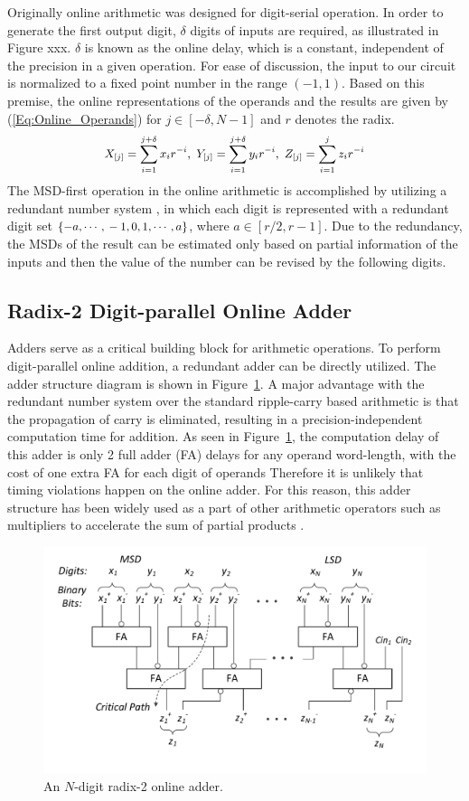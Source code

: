 \documentclass{acm_proc_article-sp}
\begin{document}
Originally online arithmetic was designed for digit-serial operation. In order to generate the first output digit, $\delta$ digits of inputs are required, as illustrated in Figure xxx. $\delta$ is known as the online delay, which is a constant, independent of the precision in a given operation. For ease of discussion, the input to our circuit is normalized to a fixed point number in the range $(-1,1)$. Based on this premise, the online representations of the operands and the results are given by (\ref{Eq:Online_Operands}) \cite{Ercegovac_Book} for $j\in[-\delta,N-1]$ and $r$ denotes the radix.
%
\begin{eqnarray}\label{Eq:Online_Operands}
\footnotesize
  X_{[j]}=\sum_{i=1}^{j+\delta}x_ir^{-i},~Y_{[j]}=\sum_{i=1}^{j+\delta}y_ir^{-i},~Z_{[j]}=\sum_{i=1}^{j}z_ir^{-i}
\normalsize
\end{eqnarray}
%
The MSD-first operation in the online arithmetic is accomplished by utilizing a redundant number system \cite{RedundantNumber}, in which each digit is represented with a redundant digit set $\{-a, \cdots,\\-1, 0, 1, \cdots, a\}$, where $a\in[r/2,r-1]$. Due to the redundancy, the MSDs of the result can be estimated only based on partial information of the inputs and then the value of the number can be revised by the following digits.

\subsection{Radix-2 Digit-parallel Online Adder}
Adders serve as a critical building block for arithmetic operations. To perform digit-parallel online addition, a redundant adder can be directly utilized. The adder structure diagram is shown in Figure~\ref{Fig:Radix2SD_adder}. A major advantage with the redundant number system over the standard ripple-carry based arithmetic is that the propagation of carry is eliminated, resulting in a precision-independent computation time for addition. As seen in Figure~\ref{Fig:Radix2SD_adder}, the computation delay of this adder is only 2 full adder (FA) delays for any operand word-length, with the cost of one extra FA for each digit of operands Therefore it is unlikely that timing violations happen on the online adder. For this reason, this adder structure has been widely used as a part of other arithmetic operators such as multipliers to accelerate the sum of partial products \cite{RedundantMult_1987,RedundantMult_1985}.
%
\begin{figure}
\includegraphics[width=.5\textwidth]{./Figures/SDAdder.pdf}
\vspace{-6.5ex}
\caption{An $N$-digit radix-2 online adder.}
\label{Fig:Radix2SD_adder}
\end{figure}
\end{document}
